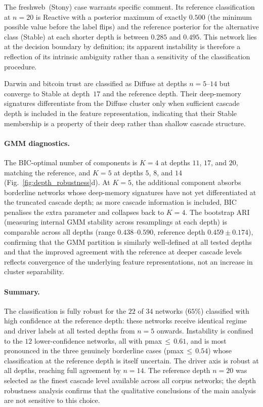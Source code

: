 \documentclass[aps,superscriptaddress,11pt]{revtex4-2}
\theoremstyle{definition}
\theoremstyle{plain}
\begin{document}
The freshweb~(Stony) case warrants specific comment.  Its reference
classification at $n = 20$ is Reactive with a posterior maximum of
exactly $0.500$ (the minimum possible value before the label flips)
and the reference posterior for the alternative class (Stable) at
each shorter depth is between $0.285$ and $0.495$.  This network lies at
the decision boundary by definition; its apparent instability is therefore
a reflection of its intrinsic ambiguity rather than a sensitivity of the
classification procedure.

Darwin and bitcoin trust are classified as Diffuse at depths $n = 5$--$14$
but converge to Stable at depth~$17$ and the reference depth.  Their
deep-memory signatures differentiate from the Diffuse cluster only when
sufficient cascade depth is included in the feature representation,
indicating that their Stable membership is a property of their deep
rather than shallow cascade structure.

\paragraph{GMM diagnostics.}
The BIC-optimal number of components is $K = 4$ at depths $11$, $17$,
and $20$, matching the reference, and $K = 5$ at depths $5$, $8$, and $14$
(Fig.~\ref{fig:depth_robustness}d).  At $K = 5$, the additional component
absorbs borderline networks whose deep-memory signatures have not yet
differentiated at the truncated cascade depth; as more cascade information
is included, BIC penalises the extra parameter and collapses back to
$K = 4$.  The bootstrap ARI (measuring internal GMM stability across
resamplings at each depth) is comparable across all depths (range
$0.438$--$0.590$, reference depth $0.459 \pm 0.174$), confirming that
the GMM partition is similarly well-defined at all tested depths and that
the improved agreement with the reference at deeper cascade levels reflects
convergence of the underlying feature representations, not an increase in
cluster separability.

\paragraph{Summary.}
The classification is fully robust for the $22$ of $34$ networks
($65\%$) classified with high confidence at the reference depth:
these networks receive identical regime and driver labels at all tested
depths from $n = 5$ onwards.  Instability is confined to the $12$
lower-confidence networks, all with pmax\,$\leq\,0.61$, and is most
pronounced in the three genuinely borderline cases (pmax\,$\leq\,0.54$)
whose classification at the reference depth is itself uncertain.
The driver axis is robust at all depths, reaching full agreement by $n
= 14$.  The reference depth $n = 20$ was selected as the finest cascade
level available across all corpus networks; the depth robustness analysis
confirms that the qualitative conclusions of the main analysis are not
sensitive to this choice.
\end{document}
